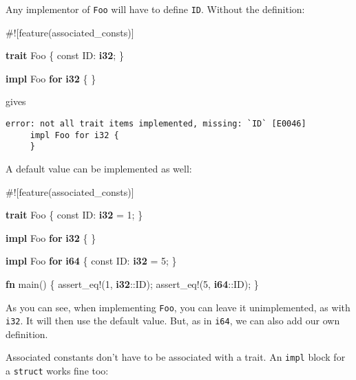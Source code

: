 \documentclass[a4paper,]{book}
\newenvironment{Shaded}{\begin{snugshade}}{\end{snugshade}}
\newcommand{\KeywordTok}[1]{\textcolor[rgb]{0.13,0.29,0.53}{\textbf{{#1}}}}
\newcommand{\DecValTok}[1]{\textcolor[rgb]{0.00,0.00,0.81}{{#1}}}
\newcommand{\OtherTok}[1]{\textcolor[rgb]{0.56,0.35,0.01}{{#1}}}
\newcommand{\NormalTok}[1]{{#1}}
\begin{document}
Any implementor of \texttt{Foo} will have to define \texttt{ID}. Without
the definition:

\begin{Shaded}
\begin{Highlighting}[]
\NormalTok{#![feature(associated_consts)]}

\KeywordTok{trait} \NormalTok{Foo \{}
    \NormalTok{const ID: }\KeywordTok{i32}\NormalTok{;}
\NormalTok{\}}

\KeywordTok{impl} \NormalTok{Foo }\KeywordTok{for} \KeywordTok{i32} \NormalTok{\{}
\NormalTok{\}}
\end{Highlighting}
\end{Shaded}

gives

\begin{verbatim}
error: not all trait items implemented, missing: `ID` [E0046]
     impl Foo for i32 {
     }
\end{verbatim}

A default value can be implemented as well:

\begin{Shaded}
\begin{Highlighting}[]
\NormalTok{#![feature(associated_consts)]}

\KeywordTok{trait} \NormalTok{Foo \{}
    \NormalTok{const ID: }\KeywordTok{i32} \NormalTok{= }\DecValTok{1}\NormalTok{;}
\NormalTok{\}}

\KeywordTok{impl} \NormalTok{Foo }\KeywordTok{for} \KeywordTok{i32} \NormalTok{\{}
\NormalTok{\}}

\KeywordTok{impl} \NormalTok{Foo }\KeywordTok{for} \KeywordTok{i64} \NormalTok{\{}
    \NormalTok{const ID: }\KeywordTok{i32} \NormalTok{= }\DecValTok{5}\NormalTok{;}
\NormalTok{\}}

\KeywordTok{fn} \NormalTok{main() \{}
    \OtherTok{assert_eq!}\NormalTok{(}\DecValTok{1}\NormalTok{, }\KeywordTok{i32}\NormalTok{::ID);}
    \OtherTok{assert_eq!}\NormalTok{(}\DecValTok{5}\NormalTok{, }\KeywordTok{i64}\NormalTok{::ID);}
\NormalTok{\}}
\end{Highlighting}
\end{Shaded}

As you can see, when implementing \texttt{Foo}, you can leave it
unimplemented, as with \texttt{i32}. It will then use the default value.
But, as in \texttt{i64}, we can also add our own definition.

Associated constants don't have to be associated with a trait. An
\texttt{impl} block for a \texttt{struct} works fine too:
\end{document}
